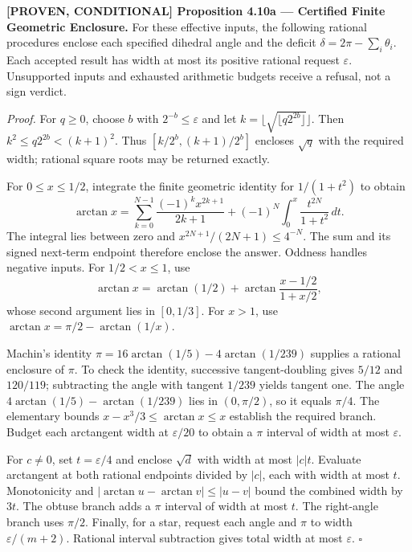 \documentclass[
  english,
  10pt,
  a4paper,
]{article}
\renewenvironment{quote}
  {\begin{leftbar}\small}
  {\end{leftbar}}
\begin{document}
\begin{quote}
\textbf{{[}PROVEN, CONDITIONAL{]} Proposition 4.10a --- Certified Finite
Geometric Enclosure.} For these effective inputs, the following rational
procedures enclose each specified dihedral angle and the deficit
\(\delta=2\pi-\sum_i\theta_i\). Each accepted result has width at most
its positive rational request \(\varepsilon\). Unsupported inputs and
exhausted arithmetic budgets receive a refusal, not a sign verdict.

\emph{Proof.} For \(q\ge0\), choose \(b\) with \(2^{-b}\le\varepsilon\)
and let \(k=\lfloor\sqrt{\lfloor q2^{2b}\rfloor}\rfloor\). Then
\(k^2\le q2^{2b}<(k+1)^2\). Thus \([k/2^b,(k+1)/2^b]\) encloses
\(\sqrt q\) with the required width; rational square roots may be
returned exactly.

For \(0\le x\le1/2\), integrate the finite geometric identity for
\(1/(1+t^2)\) to obtain \[
\arctan x=\sum_{k=0}^{N-1}\frac{(-1)^kx^{2k+1}}{2k+1}
+(-1)^N\int_0^x\frac{t^{2N}}{1+t^2}\,dt.
\] The integral lies between zero and \(x^{2N+1}/(2N+1)\le4^{-N}\). The
sum and its signed next-term endpoint therefore enclose the answer.
Oddness handles negative inputs. For \(1/2<x\le1\), use
\[\arctan x=\arctan(1/2)+\arctan\frac{x-1/2}{1+x/2},\] whose second
argument lies in \([0,1/3]\). For \(x>1\), use
\(\arctan x=\pi/2-\arctan(1/x)\).

Machin's identity \(\pi=16\arctan(1/5)-4\arctan(1/239)\) supplies a
rational enclosure of \(\pi\). To check the identity, successive
tangent-doubling gives \(5/12\) and \(120/119\); subtracting the angle
with tangent \(1/239\) yields tangent one. The angle
\(4\arctan(1/5)-\arctan(1/239)\) lies in \((0,\pi/2)\), so it equals
\(\pi/4\). The elementary bounds \(x-x^3/3\le\arctan x\le x\) establish
the required branch. Budget each arctangent width at \(\varepsilon/20\)
to obtain a \(\pi\) interval of width at most \(\varepsilon\).

For \(c\ne0\), set \(t=\varepsilon/4\) and enclose \(\sqrt d\) with
width at most \(|c|t\). Evaluate arctangent at both rational endpoints
divided by \(|c|\), each with width at most \(t\). Monotonicity and
\(|\arctan u-\arctan v|\le|u-v|\) bound the combined width by \(3t\).
The obtuse branch adds a \(\pi\) interval of width at most \(t\). The
right-angle branch uses \(\pi/2\). Finally, for a star, request each
angle and \(\pi\) to width \(\varepsilon/(m+2)\). Rational interval
subtraction gives total width at most \(\varepsilon\). \(\square\)
\end{quote}
\end{document}
